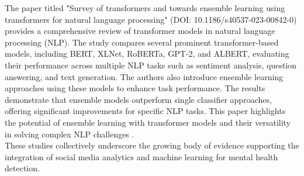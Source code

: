 \noindent
The paper titled "Survey of transformers and towards ensemble learning using transformers for natural language processing" (DOI: 10.1186/s40537-023-00842-0) provides a comprehensive review of transformer models in natural language processing (NLP). The study compares several prominent transformer-based models, including BERT, XLNet, RoBERTa, GPT-2, and ALBERT, evaluating their performance across multiple NLP tasks such as sentiment analysis, question answering, and text generation. The authors also introduce ensemble learning approaches using these models to enhance task performance. The results demonstrate that ensemble models outperform single classifier approaches, offering significant improvements for specific NLP tasks. This paper highlights the potential of ensemble learning with transformer models and their versatility in solving complex NLP challenges \cite{Zhang_2024}. \\

\noindent
These studies collectively underscore the growing body of evidence supporting the integration of social media analytics and machine learning for mental health detection.

